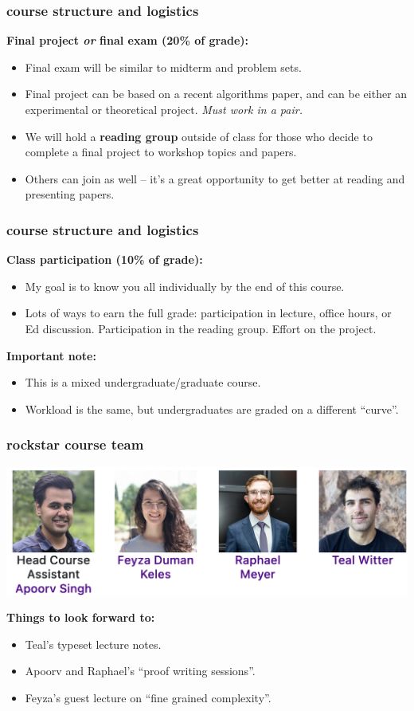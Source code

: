 \documentclass[]{beamer}
\begin{document}
	\begin{frame}
		\frametitle{course structure and logistics}
		\textbf{Final project \emph{or} final exam (20\% of grade):}
		\begin{itemize}
			\item Final exam will be similar to midterm and problem sets. 
			\item Final project can be based on a recent algorithms paper, and can be either an experimental or theoretical project. \emph{Must work in a pair.}
			\item We will hold a \textbf{reading group} outside of class for those who decide to complete a final project to workshop topics and papers. 
			\item Others can join as well -- it's a great opportunity to get better at reading and presenting papers.
		\end{itemize}
	\end{frame}
	
	\begin{frame}
		\frametitle{course structure and logistics}
		\textbf{Class participation (10\% of grade):}
		\begin{itemize}
			\item My goal is to know you all individually by the end of this course.
			\item Lots of ways to earn the full grade: participation in lecture, office hours, or Ed discussion. Participation in the reading group. Effort on the project. 
		\end{itemize}
		\textbf{Important note:}
	\begin{itemize}
		\item This is a mixed undergraduate/graduate course. 
		\item Workload is the same, but undergraduates are graded on a different ``curve''.
	\end{itemize}
	\end{frame}
	
	\begin{frame}
		\frametitle{rockstar course team}
		\begin{center}
			\includegraphics[width=\textwidth]{courseTeam.png}
		\end{center}
	\textbf{Things to look forward to:}
	\begin{itemize}
		\item Teal's typeset lecture notes.
		\item Apoorv and Raphael's ``proof writing sessions''.
		\item Feyza's guest lecture on ``fine grained complexity''.
	\end{itemize}
	\end{frame}
	
\end{document}
